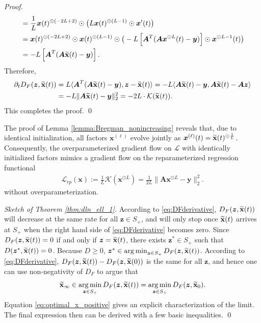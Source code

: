 \documentclass{svproc}
\newcommand{\bA}{\boldsymbol{A}}
\newcommand{\bx}{\boldsymbol{x}}
\newcommand{\by}{\boldsymbol{y}}
\newcommand{\bz}{\boldsymbol{z}}
\newcommand{\0}{\boldsymbol{0}}
\newcommand{\1}{\boldsymbol{1}}
\DeclareMathOperator*{\argmin}{arg\,min}
\renewcommand{\tilde}{\widetilde}
\def\xprod{\tilde{\bf x}}
\def\xprodinfty{\xprod_\infty}
\def\tcont{{t}}
\begin{document}
\begin{proof}
\begin{align*}
    &= \frac{1}{L} \bx(\tcont)^{\odot(-2L+2)} \odot \big( L\bx(\tcont)^{\odot(L-1)} \odot \bx'(\tcont) \big) \\
    &= \bx(\tcont)^{\odot(-2L+2)} \odot  \bx(\tcont)^{\odot(L-1)} \odot \big( - L\left[\bA^{T}( \bA\bx^{\odot L}(\tcont) -\by)\right] \odot \bx^{\odot L-1}(\tcont) \big) \\
    &= -L\left[\bA^{T}( \bA\xprod(\tcont) -\by)\right].
\end{align*}
Therefore,
\begin{align*}
    \partial_\tcont D_F(\bz,\xprod(\tcont))
    &= L\langle \bA^{T}( \bA\xprod(\tcont) -\by), \bz-\xprod(\tcont) \rangle
    = -L \langle \bA\xprod(\tcont) -\by, \bA\xprod(\tcont) - \bA\bz \rangle\\
    &= - L\|\bA\xprod(\tcont) -\by\|_2^2
     = -2L\cdot \mathcal{K}(\xprod(\tcont)).
\end{align*}
This completes the proof. \hfill \qed
\end{proof}

\begin{remark}
\label{rem:Reparameterization}
    The proof of Lemma \ref{lemma:Bregman_nonincreasing} reveals that, due to identical initialization, all factors $\bx^{(\ell)}$ evolve jointly as $\bx^{(\ell)}(t) = \xprod(t)^{\odot \frac{1}{L}}$. Consequently, the overparameterized gradient flow on $\mathcal L$ with identically initialized factors mimics a gradient flow on the reparameterized regression functional
    \begin{align*}
        \mathcal L_{rp} (\bx) := {\frac{1}{L}}\mathcal K (\bx^{\odot L}) = \frac{1}{2L} \| \bA\bx^{\odot L} - \by \|_2^2. 
    \end{align*}
    without overparameterization.
\end{remark}


\begin{proof}[Sketch of Theorem \ref{thm:dln_ell_1}]
    According to \eqref{eq:DFderivative}, $D_F(\bz,\xprod(t))$ will decrease at the same rate for all $\bz\in S_+$, and will only stop once $\xprod(t)$ arrives at $S_+$ when the right hand side of \eqref{eq:DFderivative} becomes zero. Since $D_F(\bz,\xprod(t))=0$ if and only if $\bz=\xprod(t)$, there exists $\bz^*\in S_+$ such that $D(\bz^*,\xprod(t))=0$. Because $D\geq0$, $\bz^*\in\argmin_{\bz\in S_+} D_F(\bz,\xprod(t))$. According to \eqref{eq:DFderivative}, $D_F(\bz,\xprod(t))-D_F(\bz,\xprod(0))$ is the same for all $\bz$, and hence one can use non-negativity of $D_F$ to argue that  \begin{equation}\label{eq:optimal_x_positive}
        \xprodinfty
        \in\argmin_{\bz\in S_+} D_F(\bz,\xprod(t))
        =\argmin_{\bz\in S_+} D_F(\bz,\xprod_0).
    \end{equation}
    Equation \eqref{eq:optimal_x_positive} gives an explicit characterization of the limit. The final expression then can be derived with a few basic inequalities. \hfill \qed
\end{proof}
\end{document}
